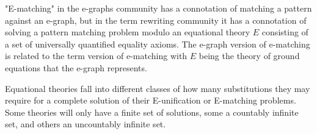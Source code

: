 \documentclass[sigconf]{acmart}
\begin{document}
"E-matching" in the e-graphs community has a connotation of matching a pattern against an e-graph, but in the term rewriting community it has a connotation of solving a pattern matching problem modulo an equational theory $E$ consisting of a set of universally quantified equality axioms. The e-graph version of e-matching is related to the term version of e-matching with $E$ being the theory of ground equations that the e-graph represents.


Equational theories fall into different classes of how many substitutions they may require for a complete solution of their E-unification or E-matching problems. Some theories will only have a finite set of solutions, some a countably infinite set, and others an uncountably infinite set.
\end{document}
